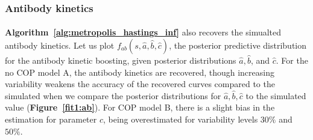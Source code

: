 \subsubsection{Antibody kinetics}

\paragraph{} \textbf{Algorithm~\ref{alg:metropolis_hastings_inf}} also recovers the simualted antibody kinetics. Let us plot $f_{ab}(s, \hat{a}, \hat{b}, \hat{c})$, the posterior predictive distribution for the antibody kinetic boosting, given posterior distributions  $\hat{a}, \hat{b}$, and $\hat{c}$. For the no COP model A, the antibody kinetics are recovered, though increasing variability weakens the accuracy of the recovered curves compared to the simulated when we compare the posterior distributions for $\hat{a}, \hat{b}, \hat{c}$ to the simulated value (\textbf{Figure~\ref{fit1:ab}}). For COP model B, there is a slight bias in the estimation for parameter $c$, being overestimated for variability levels $30\%$ and $50\%$. 

